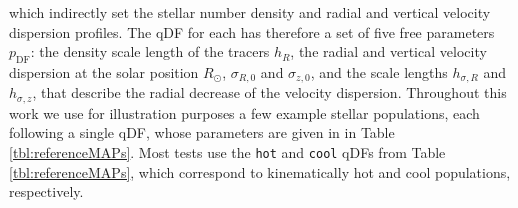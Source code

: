 which indirectly set the stellar number density and radial and vertical velocity dispersion profiles. The qDF for each \MAP{} has therefore a set of five free parameters $p_\text{DF}$: the density scale length of the tracers $h_R$, the radial and vertical velocity dispersion at the solar position $R_\odot$, $\sigma_{R,0}$ and $\sigma_{z,0}$, and the scale lengths $h_{\sigma,R}$ and $h_{\sigma,z}$, that describe the radial decrease of the velocity dispersion. Throughout this work we use for illustration purposes a few example stellar populations, each following a single qDF, whose parameters are given in in Table \ref{tbl:referenceMAPs}. Most tests use the \texttt{hot} and \texttt{cool} qDFs from Table \ref{tbl:referenceMAPs}, which correspond to kinematically hot and cool populations, respectively.\\

